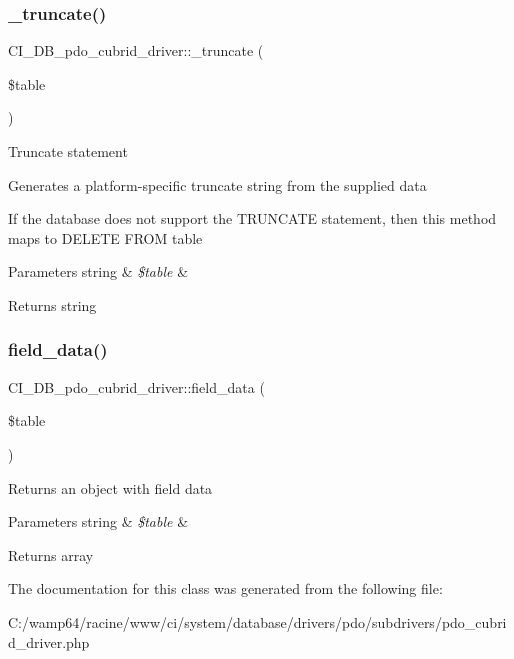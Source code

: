 \subsubsection{\texorpdfstring{\+\_\+truncate()}{\_truncate()}}
{\footnotesize\ttfamily C\+I\+\_\+\+D\+B\+\_\+pdo\+\_\+cubrid\+\_\+driver\+::\+\_\+truncate (\begin{DoxyParamCaption}\item[{}]{\$table }\end{DoxyParamCaption})\hspace{0.3cm}{\ttfamily [protected]}}

Truncate statement

Generates a platform-\/specific truncate string from the supplied data

If the database does not support the T\+R\+U\+N\+C\+A\+TE statement, then this method maps to \textquotesingle{}D\+E\+L\+E\+TE F\+R\+OM table\textquotesingle{}


\begin{DoxyParams}[1]{Parameters}
string & {\em \$table} & \\
\hline
\end{DoxyParams}
\begin{DoxyReturn}{Returns}
string 
\end{DoxyReturn}
\mbox{\label{class_c_i___d_b__pdo__cubrid__driver_a415a8f62cbf7097b55520458f10cc17e}} 
\subsubsection{\texorpdfstring{field\+\_\+data()}{field\_data()}}
{\footnotesize\ttfamily C\+I\+\_\+\+D\+B\+\_\+pdo\+\_\+cubrid\+\_\+driver\+::field\+\_\+data (\begin{DoxyParamCaption}\item[{}]{\$table }\end{DoxyParamCaption})}

Returns an object with field data


\begin{DoxyParams}[1]{Parameters}
string & {\em \$table} & \\
\hline
\end{DoxyParams}
\begin{DoxyReturn}{Returns}
array 
\end{DoxyReturn}


The documentation for this class was generated from the following file\+:\begin{DoxyCompactItemize}
\item 
C\+:/wamp64/racine/www/ci/system/database/drivers/pdo/subdrivers/pdo\+\_\+cubrid\+\_\+driver.\+php\end{DoxyCompactItemize}
